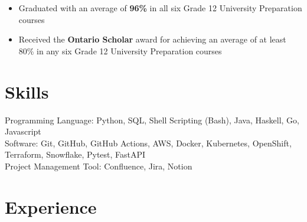 \documentclass[12pt,letterpaper,sans]{moderncv}        %
\begin{document}

\vspace{0.5em}


\vspace{-0.75em}
\begin{small}
  \begin{itemize}
    \item Graduated with an average of \textbf{96\%} in all six Grade 12 University Preparation courses
    \item Received the \textbf{Ontario Scholar} award for achieving an average of at least 80\% in any six Grade 12 University Preparation courses
  \end{itemize}
\end{small}


\vspace{-0.5em}


\section{Skills}
\begin{small}
Programming Language: Python, SQL, Shell Scripting (Bash), Java, Haskell, Go, Javascript \\
Software: Git, GitHub, GitHub Actions, AWS, Docker, Kubernetes, OpenShift, Terraform, Snowflake, Pytest, FastAPI \\ %
Project Management Tool: Confluence, Jira, Notion
\end{small}


\vspace{-0.5em}


\section{Experience}
\end{document}
